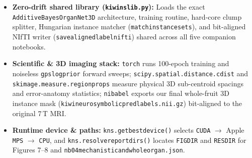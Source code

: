 \documentclass[10pt,a4paper]{article}
\renewcommand{\_}{\origunderscore\allowbreak}
\begin{document}
\begin{itemize}
\item \textbf{Zero-drift shared library (\texttt{kiwi\_ns\_lib.py}):} Loads the exact \texttt{AdditiveBayesOrganNet3D} architecture, training routine, hard-core clump splitter, Hungarian instance matcher (\texttt{match\_instance\_sets}), and bit-aligned NIfTI writer (\texttt{save\_aligned\_label\_nifti}) shared across all five companion notebooks.
\item \textbf{Scientific \& 3D imaging stack:} \texttt{torch} runs 100-epoch training and noiseless \texttt{gps\_log\_prior} forward sweeps; \texttt{scipy.spatial.distance.cdist} and \texttt{skimage.measure.regionprops} measure physical 3D sub-centroid spacings and error-anatomy statistics; \texttt{nibabel} exports our final whole-fruit 3D instance mask (\texttt{kiwi\_neurosymbolic\_pred\_labels.nii.gz}) bit-aligned to the original 7\,T MRI.
\item \textbf{Runtime device \& paths:} \texttt{kns.get\_best\_device()} selects \texttt{CUDA} $\to$ Apple \texttt{MPS} $\to$ \texttt{CPU}, and \texttt{kns.resolve\_report\_dirs()} locates \texttt{FIG\_DIR} and \texttt{RES\_DIR} for Figures 7--8 and \texttt{nb04\_mechanistic\_and\_whole\_organ.json}.
\end{itemize}
\end{document}
